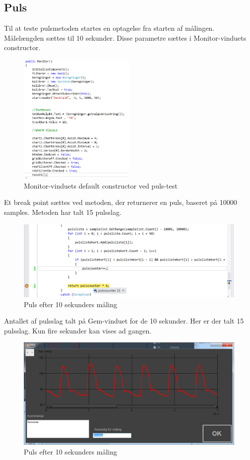 \subsection{Puls}
Til at teste pulsmetoden startes en optagelse fra starten af målingen. Målelængden sættes til 10 sekunder. Disse parametre sættes i Monitor-vinduets constructor.
\begin{figure}[H]
	\centering
	\includegraphics[width=0.5\textwidth]{Figurer/Pulstest_record}
	\caption{Monitor-vinduets default constructor ved puls-test}
\end{figure}
Et break point sættes ved metoden, der returnerer en puls, baseret på 10000 samples. Metoden har talt 15 pulsslag.
\begin{figure}[H]
	\centering
	\includegraphics[width=1\textwidth]{Figurer/Pulstest_debug}
	\caption{Puls efter 10 sekunders måling}
\end{figure}
Antallet af pulsslag talt på Gem-vinduet for de 10 sekunder. Her er der talt 15 pulsslag. Kun fire sekunder kan vises ad gangen.
\begin{figure}[H]
	\centering
	\includegraphics[width=1\textwidth]{Figurer/Pulstest_gemmevindue}
	\caption{Puls efter 10 sekunders måling}
\end{figure}

